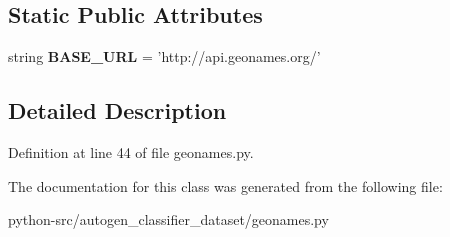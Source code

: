 \subsection*{Static Public Attributes}
\begin{DoxyCompactItemize}
\item 
\hypertarget{classgeonames_1_1GeonamesClient_adc7564ba247ee1aebfa8e502a344397d}{string {\bfseries B\-A\-S\-E\-\_\-\-U\-R\-L} = 'http\-://api.\-geonames.\-org/'}\label{classgeonames_1_1GeonamesClient_adc7564ba247ee1aebfa8e502a344397d}

\end{DoxyCompactItemize}


\subsection{Detailed Description}


Definition at line 44 of file geonames.\-py.



The documentation for this class was generated from the following file\-:\begin{DoxyCompactItemize}
\item 
python-\/src/autogen\-\_\-classifier\-\_\-dataset/geonames.\-py\end{DoxyCompactItemize}
